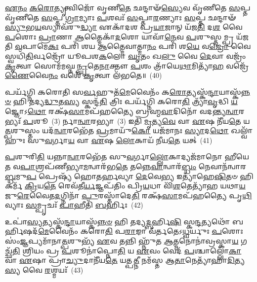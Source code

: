 \-\ul{𑌏}\-\-\ul{𑌨𑌂} \ul{𑌕}\-\-\ul{𑌰𑍋}\-\-\ul{𑌤𑍍𑌯𑍃}\-𑌤𑍍𑌵𑌿𑌜𑍋᳴ 𑌵𑍃𑌣𑍀\-\ul{𑌤𑍇} 𑌛𑌨𑍍𑌦𑌾𑍟᳴\-\ul{𑌸𑍍𑌯𑍇}\-𑌵 𑌵𑍃᳴𑌣𑍀𑌤𑍇 \ul{𑌸}\-𑌪𑍍𑌤 𑌵𑍃᳴𑌣𑍀𑌤𑍇 \ul{𑌸}\-𑌪𑍍𑌤 \ul{𑌗𑍍𑌰𑌾}\-𑌮𑍍𑌯𑌾𑌃 \ul{𑌪}\-𑌶𑌵𑌃᳴ \ul{𑌸}\-𑌪𑍍𑌤𑌾\-\ul{𑌰}\-𑌣𑍍𑌯𑌾𑌃 \ul{𑌸}\-𑌪𑍍𑌤 𑌛𑌨𑍍𑌦𑌾𑍟᳴\-\ul{𑌸𑍍𑌯𑍁}\-𑌭\-\ul{𑌯}\-𑌸𑍍𑌯𑌾𑌵᳴𑌰𑍁\-\ul{𑌦𑍍𑌧𑍍𑌯𑌾} 𑌏𑌕𑌾᳴\-𑌦𑌶 𑌪𑍍𑌰\-\ul{𑌯𑌾}\-𑌜𑌾𑌨𑍍 𑌯᳴𑌜\-\ul{𑌤𑌿} 𑌦\-\ul{𑌶} 𑌵𑍈 \ul{𑌪}\-𑌶𑍋𑌃 \ul{𑌪𑍍𑌰𑌾}\-𑌣𑌾 \ul{𑌆}\-𑌤𑍍𑌮𑍈𑌕𑌾᳴\-\ul{𑌦}\-𑌶𑍋 𑌯𑌾𑌵𑌾᳴\-\ul{𑌨𑍇}\-𑌵 \ul{𑌪}\-𑌶𑍁𑌸𑍍𑌤𑌮𑍍𑌪𑍍𑌰 𑌯᳴𑌜𑌤𑌿 \ul{𑌵}\-𑌪𑌾𑌮𑍇\-\ul{𑌕𑌃} 𑌪𑌰𑌿᳴ 𑌶𑌯 \ul{𑌆}\-𑌤𑍍𑌮𑍈𑌵𑌾𑌤𑍍𑌮𑌾\-\ul{𑌨𑌂} 𑌪𑌰𑌿᳴ 𑌶\-\ul{𑌯𑍇} 𑌵\-\ul{𑌜𑍍𑌰𑍋} 𑌵𑍈 𑌸𑍍𑌵𑌧𑌿᳴\-\ul{𑌤𑌿}\-𑌰𑍍𑌵𑌜𑍍𑌰𑍋᳴ 𑌯𑍂𑌪𑌶\-\ul{𑌕}\-𑌲𑍋 \ul{𑌘𑍃}\-𑌤𑌂 𑌖\-\ul{𑌲𑍁} 𑌵𑍈 \ul{𑌦𑍇}\-𑌵𑌾 𑌵𑌜𑍍𑌰𑌂᳴ \ul{𑌕𑍃}\-𑌤𑍍𑌵𑌾 𑌸𑍋𑌮᳴𑌮𑌘𑍍𑌨\-\ul{𑌨𑍍𑌘𑍃}\-𑌤𑍇\-\ul{𑌨𑌾}\-𑌕𑍍𑌤𑍗 \ul{𑌪}\-𑌶𑌂 𑌤𑍍𑌰𑌾᳴𑌯𑍇\-\ul{𑌥𑌾}\-𑌮𑌿𑌤𑍍𑌯𑌾᳴\-\ul{𑌹} 𑌵𑌜𑍍𑌰𑍇᳴\-\ul{𑌣𑍈}\-𑌵𑍈\-\ul{𑌨𑌂} 𑌵𑌶𑍇᳴ \ul{𑌕𑍃}\-𑌤𑍍𑌵𑌾 𑌲᳴𑌭𑌤𑍇॥~(40)

{\anuvakamend[{\-\ul{𑌆}\-\-\ul{𑌘𑌾}\-𑌰𑌮𑍍𑌪᳴𑌦𑍍𑌯\-\ul{𑌨𑍍𑌤𑍇} 𑌦𑍍𑌵𑌾𑌦᳴\-\ul{𑌶𑌾}\-𑌤𑍍𑌮\-\ul{𑌨𑍍𑌨𑍇}\-𑌵 \ul{𑌯}\-𑌜𑍍𑌞\-\ul{𑌸𑍍𑌯} 𑌮𑍇𑌧𑍍𑌯᳴\-\ul{𑌮𑍇}\-𑌵 𑌖\-\ul{𑌲𑍁} 𑌵𑌾 \ul{𑌅}\-𑌷𑍍𑌟𑌾𑌦᳴𑌶 𑌚}]}%

𑌪𑌰𑍍𑌯᳴𑌗𑍍𑌨𑌿 𑌕𑌰𑍋𑌤𑌿 𑌸\-\ul{𑌰𑍍𑌵}\-𑌹𑍁𑌤᳴\-\ul{𑌮𑍇}\-𑌵𑍈𑌨𑌂᳴ 𑌕\-\ul{𑌰𑍋}\-𑌤𑍍𑌯𑌸𑍍𑌕᳴\-\ul{𑌨𑍍𑌦𑌾}\-𑌯𑌾𑌸𑍍𑌕᳴\-\ul{𑌨𑍍𑌨}\-\-\ul{𑍞} 𑌹𑌿 𑌤𑌦𑍍𑌯\-\ul{𑌦𑍍𑌧𑍁}\-𑌤\-\ul{𑌸𑍍𑌯} 𑌸𑍍𑌕𑌨𑍍𑌦᳴\-\ul{𑌤𑌿} 𑌤𑍍𑌰𑌿𑌃 𑌪𑌰𑍍𑌯᳴𑌗𑍍𑌨𑌿 𑌕𑌰𑍋\-\ul{𑌤𑌿} 𑌤𑍍𑌰𑍍𑌯𑌾᳴\-\ul{𑌵𑍃}\-𑌦𑍍𑌧𑌿 \ul{𑌯}\-𑌜𑍍𑌞𑍋\-𑌽\-\ul{𑌥𑍋} 𑌰𑌕𑍍𑌷᳴\-\ul{𑌸𑌾}\-𑌮𑌪᳴𑌹𑌤𑍍𑌯𑍈 𑌬𑍍𑌰𑌹𑍍𑌮\-\ul{𑌵𑌾}\-𑌦𑌿𑌨𑍋᳴ 𑌵𑌦𑌨𑍍𑌤𑍍𑌯\-\ul{𑌨𑍍𑌵𑌾}\-𑌰𑌭𑍍𑌯𑌃᳴ \ul{𑌪}\-𑌶𑍂~(3) 𑌰𑍍𑌨𑌾\-\ul{𑌨𑍍𑌵𑌾}\-𑌰𑌭𑍍𑌯𑌾~(3) 𑌇𑌤𑌿᳴ \ul{𑌮𑍃}\-𑌤𑍍𑌯\-\ul{𑌵𑍇} 𑌵𑌾 \ul{𑌏}\-𑌷 𑌨𑍀᳴𑌯\-\ul{𑌤𑍇} 𑌯\-\ul{𑌤𑍍𑌪}\-𑌶𑍁𑌸𑍍𑌤𑌂 𑌯𑌦᳴\-\ul{𑌨𑍍𑌵𑌾}\-𑌰𑌭𑍇᳴𑌤 \ul{𑌪𑍍𑌰}\-𑌮𑌾𑌯𑍁᳴\-\ul{𑌕𑍋} 𑌯𑌜᳴𑌮𑌾𑌨𑌃 \ul{𑌸𑍍𑌯𑌾}\-𑌦\-\ul{𑌥𑍋} 𑌖𑌲𑍍𑌵𑌾᳴𑌹𑍁𑌃 𑌸𑍁\-\ul{𑌵}\-𑌰𑍍𑌗𑌾\-\ul{𑌯} 𑌵𑌾 \ul{𑌏}\-𑌷 \ul{𑌲𑍋}\-𑌕𑌾𑌯᳴ 𑌨𑍀𑌯\-\ul{𑌤𑍇} 𑌯𑌤𑍍~(41)

\-\ul{𑌪}\-𑌶𑍁𑌰𑌿\-\ul{𑌤𑌿} 𑌯𑌨𑍍𑌨𑌾\-\ul{𑌨𑍍𑌵𑌾}\-𑌰𑌭𑍇᳴𑌤 𑌸𑍁\-\ul{𑌵}\-𑌰𑍍𑌗𑌾\-\ul{𑌲𑍍𑌲𑍋}\-𑌕𑌾𑌦𑍍𑌯𑌜᳴𑌮𑌾𑌨𑍋 𑌹𑍀𑌯𑍇𑌤 𑌵\-\ul{𑌪𑌾}\-𑌶𑍍𑌰𑌪᳴𑌣𑍀𑌭𑍍𑌯𑌾\-\ul{𑌮}\-𑌨𑍍𑌵𑌾𑌰᳴𑌭\-\ul{𑌤𑍇} 𑌤𑌨𑍍𑌨𑍇\-\ul{𑌵𑌾}\-𑌨𑍍𑌵𑌾𑌰᳴\-\ul{𑌬𑍍𑌧𑌂} 𑌨𑍇𑌵𑌾𑌨᳴𑌨𑍍𑌵𑌾𑌰\-\ul{𑌬𑍍𑌧}\-𑌮𑍁\-\ul{𑌪} 𑌪𑍍𑌰𑍇𑌷𑍍𑌯᳴ 𑌹𑍋𑌤𑌰𑍍\mbox{}\-\ul{𑌹}\-𑌵𑍍𑌯𑌾 \ul{𑌦𑍇}\-𑌵𑍇\-\ul{𑌭𑍍𑌯} 𑌇𑌤𑍍𑌯𑌾᳴𑌹𑍇\-\ul{𑌷𑌿}\-𑌤𑍞 𑌹𑌿 𑌕𑌰𑍍𑌮᳴ \ul{𑌕𑍍𑌰𑌿}\-𑌯\-\ul{𑌤𑍇} 𑌰𑍇𑌵᳴𑌤𑍀\-\ul{𑌰𑍍𑌯}\-𑌜𑍍𑌞𑌪᳴𑌤𑌿𑌂 𑌪𑍍𑌰𑌿\-\ul{𑌯}\-𑌧𑌾 𑌵𑌿᳴\-\ul{𑌶}\-𑌤𑍇𑌤𑍍𑌯𑌾᳴𑌹 𑌯𑌥𑌾\-\ul{𑌯}\-𑌜𑍁\-\ul{𑌰𑍇}\-𑌵𑍈𑌤\-\ul{𑌦}\-𑌗𑍍𑌨𑌿𑌨𑌾᳴ \ul{𑌪𑍁}\-𑌰𑌸𑍍𑌤𑌾᳴𑌦𑍇\-\ul{𑌤𑌿} 𑌰𑌕𑍍𑌷᳴\-\ul{𑌸𑌾}\-𑌮𑌪᳴𑌹𑌤𑍍𑌯𑍈 𑌪𑍃\-\ul{𑌥𑌿}\-𑌵𑍍𑌯𑌾𑌃 \ul{𑌸}\-𑌮𑍍𑌪𑍃𑌚𑌃᳴ \ul{𑌪𑌾}\-𑌹𑍀𑌤𑌿᳴ \ul{𑌬}\-𑌰𑍍\mbox{}𑌹𑌿𑌃~(42)

𑌉𑌪𑌾॑\-\ul{𑌸𑍍𑌯}\-𑌤𑍍𑌯𑌸𑍍𑌕᳴\-\ul{𑌨𑍍𑌦𑌾}\-𑌯𑌾𑌸𑍍𑌕᳴\-\ul{𑌨𑍍𑌨}\-\-\ul{𑍞} 𑌹𑌿 𑌤𑌦𑍍𑌯\-\ul{𑌦𑍍𑌬}\-𑌰𑍍\mbox{}𑌹𑌿\-\ul{𑌷𑌿} 𑌸𑍍𑌕\-\ul{𑌨𑍍𑌦}\-𑌤𑍍𑌯𑌥𑍋᳴ 𑌬𑌰𑍍\mbox{}\-\ul{𑌹𑌿}\-𑌷𑌦᳴\-\ul{𑌮𑍇}\-𑌵𑍈𑌨𑌂᳴ 𑌕𑌰𑍋\-\ul{𑌤𑌿} 𑌪\-\ul{𑌰𑌾}\-𑌙𑌾 𑌵᳴𑌰𑍍𑌤𑌤𑍇\-𑌽\-\ul{𑌧𑍍𑌵}\-𑌰𑍍𑌯𑍁𑌃 \ul{𑌪}\-𑌶𑍋𑌃 𑌸𑌂॑\-\ul{𑌜𑍍𑌞}\-𑌪𑍍𑌯𑌮𑌾᳴𑌨𑌾\-\ul{𑌤𑍍𑌪}\-𑌶𑍁𑌭𑍍𑌯᳴ \ul{𑌏}\-𑌵 𑌤𑌨𑍍𑌨𑌿 𑌹𑍍𑌨𑍁᳴𑌤 \ul{𑌆}\-𑌤𑍍𑌮𑌨𑍋𑌨𑌾॑𑌵𑍍𑌰𑌸𑍍𑌕𑌾\-\ul{𑌯} 𑌗𑌚𑍍𑌛᳴\-\ul{𑌤𑌿} 𑌶𑍍𑌰𑌿𑌯𑌂 𑌪𑍍𑌰 \ul{𑌪}\-𑌶𑍂𑌨𑌾॑𑌪𑍍𑌨𑍋\-\ul{𑌤𑌿} 𑌯 \ul{𑌏}\-𑌵𑌂 𑌵𑍇𑌦᳴ \ul{𑌪}\-𑌶𑍍𑌚𑌾𑌲𑍍𑌲𑍋᳴\-\ul{𑌕𑌾} 𑌵𑌾 \ul{𑌏}\-𑌷𑌾 𑌪𑍍𑌰𑌾\-\ul{𑌚𑍍𑌯𑍁}\-𑌦𑌾𑌨𑍀᳴𑌯\-\ul{𑌤𑍇} 𑌯𑌤𑍍𑌪\-\ul{𑌤𑍍𑌨𑍀} 𑌨𑌮᳴𑌸𑍍𑌤 𑌆\-\ul{𑌤𑌾}\-𑌨𑍇𑌤𑍍𑌯𑌾᳴𑌹𑌾\-\ul{𑌦𑌿}\-𑌤𑍍𑌯\-\ul{𑌸𑍍𑌯} 𑌵𑍈 \ul{𑌰}\-𑌶𑍍𑌮𑌯𑌃᳴~(43)

